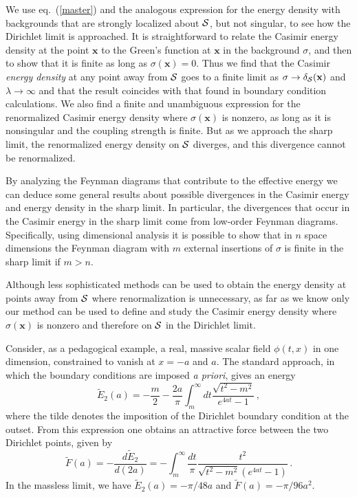 \documentclass[a4paper,aps,amsfonts,prl,showpacs,nobibnotes,nofootinbib,%
tightenlines,twocolumn]{revtex4}
\newcommand{\vek}[1]{\mathbf{#1}}
\begin{document}
We use eq.~(\ref{master}) and the analogous expression for the energy
density with backgrounds that are strongly localized about ${\cal S}$,
but not singular, to see how the Dirichlet limit is approached. 
It is straightforward to relate the Casimir energy density at the
point $\vek x$ to the Green's function at $\vek x$ in the background
$\sigma$, and then to show that it is finite as long as $\sigma(\vek
x)=0$.  Thus we find that the Casimir \emph{energy density} at any
point away from ${\cal S}$ goes to a finite limit as
$\sigma\to\delta_{\cal S}(\vek x)$ and $\lambda\to\infty$ and that the
result coincides with that found in boundary condition calculations. 
We also find a finite and unambiguous expression for the renormalized
Casimir energy density where $\sigma(\vek{x})$ is nonzero, as long as
it is nonsingular and the coupling strength is finite.  But as we
approach the sharp limit, the renormalized energy density on
${\cal S}$ diverges, and this divergence cannot be renormalized.

By analyzing the Feynman diagrams that contribute to the effective
energy we can deduce some general results about possible divergences
in the Casimir energy and energy density in the sharp limit.  In
particular, the divergences that occur in the Casimir energy in the
sharp limit come from low-order Feynman diagrams.  Specifically, using
dimensional analysis it is possible to show that in $n$ space
dimensions the Feynman diagram with $m$ external insertions of
$\sigma$ is finite in the sharp limit if $m>n$. 

Although less sophisticated methods can be used to obtain the energy
density at points away from ${\cal S}$ where renormalization is
unnecessary, as far as we know only our method can be used to define
and study the Casimir energy density where $\sigma(\vek{x})$ is nonzero
and therefore on ${\cal S}$ in the Dirichlet limit.   

Consider, as a pedagogical example, a real, massive scalar field
$\phi(t,x)$ in one dimension, constrained to vanish at $x=-a$ and $a$. 
The standard approach, in which the boundary conditions are imposed
{\it a priori\/}, gives an energy \cite{MT}
%
\begin{equation}
\widetilde{E}_{2}(a) = -\frac{m}{2} -
\frac{2a}{\pi}\int_{m}^{\infty}dt\frac{\sqrt{t^2-m^2}}{e^{4at}-1} \,,
\label{wrongenergy}
\end{equation}
%
where the tilde denotes the imposition of the Dirichlet boundary
condition at the outset.  From this expression one obtains an
attractive force between the two Dirichlet points, given by
%
\begin{equation}
\widetilde{F}(a)=-\frac{d\widetilde{E}_{2}}{d(2a)}
=-\int_{m}^{\infty}\frac{dt}{\pi}\frac{t^2}{\sqrt{t^2- m^2}(e^{4at}-1)}\, .
\label{force1}
\end{equation}
%
In the massless limit, we have $\widetilde{E}_{2}(a) = - \pi/48a$ and
$\widetilde{F}(a) = - \pi/96a^2$.
\end{document}
